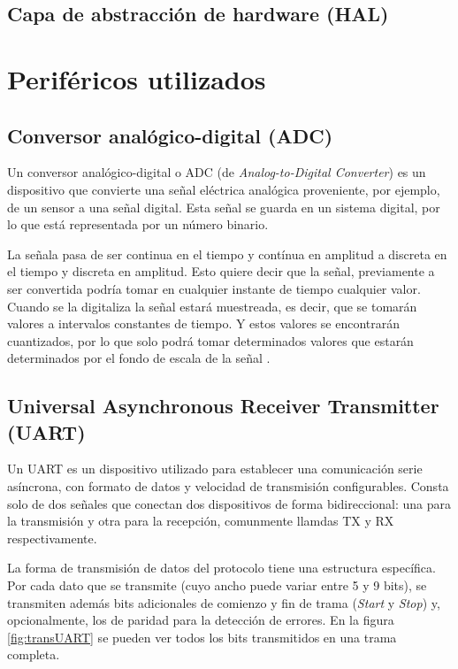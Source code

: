 \subsection{Capa de abstracción de hardware (HAL)}

\section{Periféricos utilizados}

\subsection{Conversor analógico-digital (ADC)}

Un conversor analógico-digital o ADC (de \textit{Analog-to-Digital Converter}) es un dispositivo que convierte una señal eléctrica analógica proveniente, por ejemplo, de un sensor a una señal digital. Esta señal  se guarda en un sistema digital, por lo que está representada por un número binario.

La señala pasa de ser continua en el tiempo y contínua en amplitud a discreta en el tiempo y discreta en amplitud. Esto quiere decir que la señal, previamente a ser convertida podría tomar en cualquier instante de tiempo cualquier valor. Cuando se la digitaliza la señal estará muestreada, es decir, que se tomarán valores a intervalos constantes de tiempo. Y estos valores se encontrarán cuantizados, por lo que solo podrá tomar determinados valores que estarán determinados por el fondo de escala de la señal \citep{WEBSITE:2}.


\subsection{Universal Asynchronous Receiver Transmitter (UART)}

Un UART es un dispositivo utilizado para establecer una comunicación serie asíncrona, con formato de datos y velocidad de transmisión configurables. Consta solo de dos señales que conectan dos dispositivos de forma bidireccional: una para la transmisión y otra para la recepción, comunmente llamdas TX y RX respectivamente.

La forma de transmisión de datos del protocolo tiene una estructura específica. Por cada dato que se transmite (cuyo ancho puede variar entre 5 y 9 bits), se transmiten además bits adicionales de comienzo y fin de trama (\textit{Start} y \textit{Stop}) y, opcionalmente, los de paridad para la detección de errores. En la figura \ref{fig:transUART} se pueden ver todos los bits transmitidos en una trama completa.

